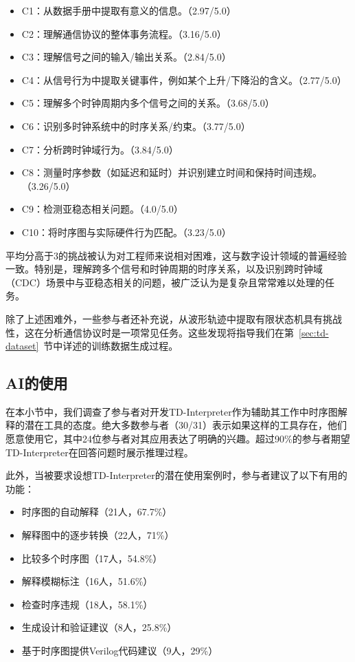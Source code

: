 \begin{itemize}
  \item C1：从数据手册中提取有意义的信息。（2.97/5.0）
  \item C2：理解通信协议的整体事务流程。（3.16/5.0）
  \item C3：理解信号之间的输入/输出关系。（2.84/5.0）
  \item C4：从信号行为中提取关键事件，例如某个上升/下降沿的含义。（2.77/5.0）
  \item C5：理解多个时钟周期内多个信号之间的关系。（3.68/5.0）
  \item C6：识别多时钟系统中的时序关系/约束。（3.77/5.0）
  \item C7：分析跨时钟域行为。（3.84/5.0）
  \item C8：测量时序参数（如延迟和延时）并识别建立时间和保持时间违规。（3.26/5.0）
  \item C9：检测亚稳态相关问题。（4.0/5.0）
  \item C10：将时序图与实际硬件行为匹配。（3.23/5.0）
\end{itemize}

平均分高于3的挑战被认为对工程师来说相对困难，这与数字设计领域的普遍经验一致。特别是，理解跨多个信号和时钟周期的时序关系，以及识别跨时钟域（CDC）场景中与亚稳态相关的问题，被广泛认为是复杂且常常难以处理的任务。

除了上述困难外，一些参与者还补充说，从波形轨迹中提取有限状态机具有挑战性，这在分析通信协议时是一项常见任务。这些发现将指导我们在第~\ref{sec:td-dataset}~节中详述的训练数据生成过程。

\subsection{AI的使用}

在本小节中，我们调查了参与者对开发TD-Interpreter作为辅助其工作中时序图解释的潜在工具的态度。绝大多数参与者（30/31）表示如果这样的工具存在，他们愿意使用它，其中24位参与者对其应用表达了明确的兴趣。超过90\%的参与者期望TD-Interpreter在回答问题时展示推理过程。

此外，当被要求设想TD-Interpreter的潜在使用案例时，参与者建议了以下有用的功能：
\begin{itemize}
  \item 时序图的自动解释（21人，67.7\%）
  \item 解释图中的逐步转换（22人，71\%）
  \item 比较多个时序图（17人，54.8\%）
  \item 解释模糊标注（16人，51.6\%）
  \item 检查时序违规（18人，58.1\%）
  \item 生成设计和验证建议（8人，25.8\%）
  \item 基于时序图提供Verilog代码建议（9人，29\%）
\end{itemize}

